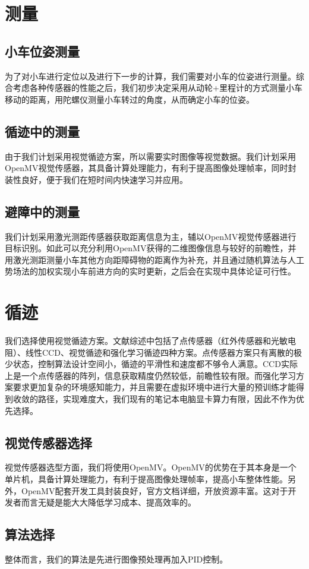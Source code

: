 \documentclass{report}
\begin{document}
\section{测量}
\label{sec:label}
\subsection{小车位姿测量}
\label{subsec:label}
为了对小车进行定位以及进行下一步的计算，我们需要对小车的位姿进行测量。综合考虑各种传感器的性能之后，我们初步决定采用从动轮+里程计的方式测量小车移动的距离，用陀螺仪测量小车转过的角度，从而确定小车的位姿。
\subsection{循迹中的测量}
\label{subsec:label}
由于我们计划采用视觉循迹方案，所以需要实时图像等视觉数据。我们计划采用OpenMV视觉传感器，其具备计算处理能力，有利于提高图像处理帧率，同时封装性良好，便于我们在短时间内快速学习并应用。
\subsection{避障中的测量}
\label{subsec:label}
我们计划采用激光测距传感器获取距离信息为主，辅以OpenMV视觉传感器进行目标识别。如此可以充分利用OpenMV获得的二维图像信息与较好的前瞻性，并用激光测距测量小车其他方向距障碍物的距离作为补充，并且通过随机算法与人工势场法的加权实现小车前进方向的实时更新，之后会在实现中具体论证可行性。
\section{循迹}
\label{sec:label}
我们选择使用视觉循迹方案。文献综述中包括了点传感器（红外传感器和光敏电阻）、线性CCD、视觉循迹和强化学习循迹四种方案。点传感器方案只有离散的极少状态，控制算法设计空间小，循迹的平滑性和速度都不够令人满意。CCD实际上是一个点传感器的阵列，信息获取精度仍然较低，前瞻性较有限。而强化学习方案要求更加复杂的环境感知能力，并且需要在虚拟环境中进行大量的预训练才能得到收敛的路径，实现难度大，我们现有的笔记本电脑显卡算力有限，因此不作为优先选择。
\subsection{视觉传感器选择}
\label{subsec:label}
视觉传感器选型方面，我们将使用OpenMV。OpenMV的优势在于其本身是一个单片机，具备计算处理能力，有利于提高图像处理帧率，提高小车整体性能。另外，OpenMV配套开发工具封装良好，官方文档详细，开放资源丰富。这对于开发者而言无疑是能大大降低学习成本、提高效率的。
\subsection{算法选择}
\label{subsec:label}
整体而言，我们的算法是先进行图像预处理再加入PID控制。
\end{document}
